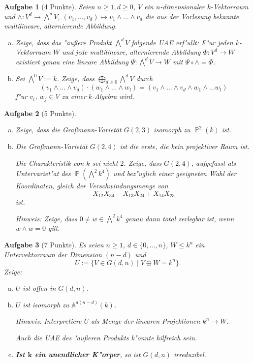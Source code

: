 \documentclass[a4paper, 12pt, numbers=noendperiod, chapterprefix=true]{scrbook}
\theoremstyle{break}
\newtheorem{Aufg}{Aufgabe}
\theoremstyle{nonumberbreak}
\theoremstyle{nonumberplain}
\newcommand{\A}{\mathbb{A}}
\newcommand{\Affine}{\mathbb{A}} %
\DeclareMathOperator{\Projective}{\mathbb{P}} %
\begin{document}
\begin{Aufg}[4 Punkte]
Seien $n \geq 1, d \geq 0$, $V$ ein $n$-dimensionaler $k$-Vektorraum und $\wedge \colon V^d \to \bigwedge^dV$, $(v_1, \dots, v_d) \mapsto v_1 \wedge \dots \wedge v_d$ die aus der Vorlesung bekannte multilineare, alternierende Abbildung. 
\begin{enumerate}[a)]
	\item Zeige, dass das "au\ss ere Produkt $\bigwedge^dV$ folgende UAE erf"ullt:
	F"ur jeden $k$-Vektorraum $W$ und jede multilineare, alternierende Abbildung $\Phi\colon V^d \to W$ existiert genau eine lineare Abbildung $\Psi \colon \bigwedge^d V \to W$ mit $\Psi \circ \wedge = \Phi$.
	\item Sei $\bigwedge^0 V := k$. Zeige, dass $\bigoplus\limits_{d\geq 0} \bigwedge^d V$ durch 
		\[(v_{1} \wedge \dots \wedge v_{d}) \cdot (w_{1} \wedge \dots \wedge w_l) = (v_1 \wedge \dots \wedge v_d \wedge w_1 \wedge \dots w_l)\]
	f"ur $v_i$, $w_j \in V$ zu einer $k$-Algebra wird.
\end{enumerate}
\end{Aufg}

\begin{Aufg}[5 Punkte]
\begin{enumerate}[a)]
	\item Zeige, dass die Gra\ss mann-Variet\"at $G(2,3)$ isomorph zu $\Projective^2(k)$ ist.
	\item Die Gra\ss mann-Variet\"at $G(2,4)$ ist die erste, die kein projektiver Raum ist.

	Die Charakteristik von $k$ sei nicht $2$. Zeige, dass $G(2,4)$, aufgefasst als Untervariet"at des $\Projective(\bigwedge^2 k^4)$ und bez"uglich einer geeigneten Wahl der Koordinaten, gleich der Verschwindungsmenge von
		\[X_{12}X_{34} - X_{13}X_{24} + X_{14}X_{23}\]
	ist.
	
	\emph{Hinweis: Zeige, dass $0\neq w\in \bigwedge^2k^4$ genau dann total zerlegbar ist, wenn $w\wedge w = 0$ gilt.}
\end{enumerate}\end{Aufg}

\begin{Aufg}[7 Punkte]
Es seien $n \geq 1$, $d \in \{0,\dots, n\}$, $W \leq k^n$ ein Untervektorraum der Dimension $(n-d)$ und
	\[U := \{V \in G(d,n) \mid V \oplus W = k^n \}.\]
\emph{Zeige}:
\begin{enumerate}[a)]
	\item $U$ ist offen in $G(d,n)$.
	\item $U$ ist isomorph zu $\Affine^{d(n-d)}(k)$.
	
	\textit{Hinweis:} Interpretiere $U$ als Menge der linearen Projektionen $k^n \rightarrow W$.
	
	Auch die UAE des "au\ss eren Produkts k"onnte hilfreich sein.

	\item \textbf{Ist $\mathbf{k}$ ein unendlicher K"orper}, so ist $G(d,n)$ irreduzibel.
\end{enumerate}\end{Aufg}
\end{document}
